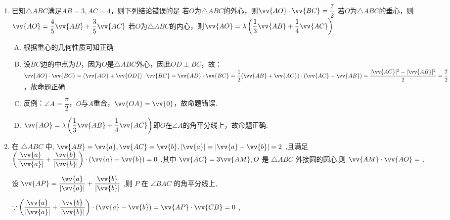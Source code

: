 \begin{enumerate}
\begin{enumerate}
\begin{jieda}
\begin{enumerate}[A.]
            \end{enumerate}
        \end{jieda}
        \item 已知$\triangle ABC$满足$AB = 3, AC = 4$，则下列结论错误的是
        {若$O$为$\triangle ABC$的外心，则$\vv{AO} \cdot \vv{BC} = \dfrac{7}{2}$}
        {若$O$为$\triangle ABC$的垂心，则$\vv{AO} = \dfrac{4}{5}\vv{AB} + \dfrac{3}{5}\vv{AC}$}
        {若$O$为$\triangle ABC$的内心，则$\vv{AO} = \lambda \left ( \dfrac{1}{3}\vv{AB} + \dfrac{1}{4}\vv{AC}\right)$}
        \begin{jieda}
            \begin{enumerate}[A.]
                \item 根据重心的几何性质可知正确
                \item 设$BC$边的中点为$D$，因为$O$是$\triangle ABC$外心，因此$OD \perp BC$，故：\\
                $\vv{AO} \cdot \vv{BC} = (\vv{AO} + \vv{OD}) \cdot \vv{BC} = \vv{AD} \cdot \vv{BC} = \dfrac{1}{2}(\vv{AB} + \vv{AC}) \cdot (\vv{AC} - \vv{AB}) = \dfrac{|\vv{AC}|^2 - |\vv{AB}|^2}{2} = \dfrac{7}{2}$，故命题正确.
                \item 反例：$\angle A = \dfrac{\pi}{2}$，$O$与$A$重合，$\vv{OA} = \vv{0}$，故命题错误.
                \item $\vv{AO} = \lambda \left ( \dfrac{1}{3}\vv{AB} + \dfrac{1}{4}\vv{AC}\right)$即$O$在$\angle A$的角平分线上，故命题正确.
            \end{enumerate}
        \end{jieda}
        
        \item 在 $\bigtriangleup {ABC}$ 中, $\vv{AB} = \vv{a},\vv{AC} = \vv{b},\left| \vv{a}\right|  = \left| {\vv{a} - \vv{b}}\right|  = 2$ ,且满足 $\left( {\dfrac{\vv{a}}{\left| \vv{a}\right| } + \dfrac{\vv{b}}{\left| \vv{b}\right| }}\right)  \cdot  \left( {\vv{a} - \vv{b}}\right)  = 0$ ,其中 $\vv{AC} = 3\vv{AM},O$ 是 $\bigtriangleup  {ABC}$ 外接圆的圆心,则 $\vv{AM} \cdot  \vv{AO} =$ .
        \begin{jieda}
            设 $\vv{AP} = \dfrac{\vv{a}}{\left| \vv{a}\right| } + \dfrac{\vv{b}}{\left| \vv{b}\right| }$ ,则 $P$ 在 $\angle {BAC}$ 的角平分线上,
            
            $\because \left( {\dfrac{\vv{a}}{\left| \vv{a}\right| } + \dfrac{\vv{b}}{\left| \vv{b}\right| }}\right)  \cdot  \left( {\vv{a} - \vv{b}}\right)  = \vv{AP} \cdot  \vv{CB} = 0$ ,
            

\end{jieda}
\end{enumerate}
\end{enumerate}
